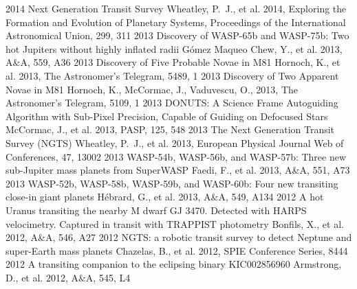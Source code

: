 \documentclass[print]{friggeri-cv} %
\begin{document}
\begin{entrylist}
\entry
{\small 2014}
{\normalfont \small Next Generation Transit Survey}
{}
{\small Wheatley, P.~J., et al. 2014, Exploring the Formation and Evolution of Planetary Systems, Proceedings of the International Astronomical Union, 299, 311}
\entry
{\small 2013}
{\normalfont \small Discovery of WASP-65b and WASP-75b: Two hot Jupiters without highly inflated radii}
{}
{\small G{\'o}mez Maqueo Chew, Y., et al. 2013, A\&A, 559, A36}
\entry
{\small 2013}
{\normalfont \small Discovery of Five Probable Novae in M81}
{}
{\small Hornoch, K., et al. 2013, The Astronomer's Telegram, 5489, 1}
\entry
{\small 2013}
{\normalfont \small Discovery of Two Apparent Novae in M81}
{}
{\small Hornoch, K., McCormac, J., Vaduvescu, O., 2013, The Astronomer's Telegram, 5109, 1}
\entry
{\small 2013}
{\small DONUTS: A Science Frame Autoguiding Algorithm with Sub-Pixel Precision, Capable of Guiding on Defocused Stars}
{}
{\small McCormac, J., et al. 2013, PASP, 125, 548}
\entry
{\small 2013}
{\normalfont \small The Next Generation Transit Survey (NGTS)}
{}
{\small Wheatley, P.~J., et al. 2013, European Physical Journal Web of Conferences, 47, 13002}
\entry
{\small 2013}
{\normalfont \small WASP-54b, WASP-56b, and WASP-57b: Three new sub-Jupiter mass planets from SuperWASP}
{}
{\small Faedi, F., et al. 2013, A\&A, 551, A73}
\entry
{\small 2013}
{\normalfont \small WASP-52b, WASP-58b, WASP-59b, and WASP-60b: Four new transiting close-in giant planets}
{}
{\small H{\'e}brard, G., et al. 2013, A\&A, 549, A134}
\entry
{\small 2012}
{\normalfont \small A hot Uranus transiting the nearby M dwarf GJ 3470. Detected with HARPS velocimetry. Captured in transit with TRAPPIST photometry}
{}
{\small Bonfils, X., et al. 2012, A\&A, 546, A27}
\entry
{\small 2012}
{\normalfont \small NGTS: a robotic transit survey to detect Neptune and super-Earth mass planets}
{}
{\small Chazelas, B., et al. 2012, SPIE Conference Series, 8444}
\entry
{\small 2012}
{\normalfont \small A transiting companion to the eclipsing binary KIC002856960}
{}
{\small Armstrong, D., et al. 2012, A\&A, 545, L4}
\end{entrylist}
\end{document}
